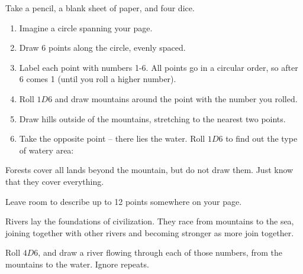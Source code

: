\begin{multicols}{2}


Take a pencil, a blank sheet of paper, and four dice.

\begin{enumerate}
\item
  Imagine a circle spanning your page.
\item
  Draw 6 points along the circle, evenly spaced.
\item
  Label each point with numbers 1-6.
  All points go in a circular order, so after 6 comes 1 (until you roll a higher number).
\item
  Roll $1D6$ and draw mountains around the point with the number you rolled.
\item
  Draw hills outside of the mountains, stretching to the nearest two points.
\item
  Take the opposite point -- there lies the water.
  Roll $1D6$ to find out the type of watery area:
\end{enumerate}

\noindent
Forests cover all lands beyond the mountain, but do not draw them. Just
know that they cover everything.

Leave room to describe up to 12 points somewhere on your page.


Rivers lay the foundations of civilization.
They race from mountains to the sea, joining together with other rivers and becoming stronger as more join together.

Roll $4D6$, and draw a river flowing through each of those numbers, from the mountains to the water.
Ignore repeats.


\end{multicols}
